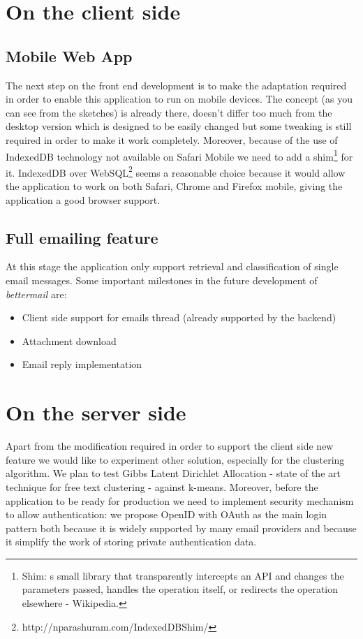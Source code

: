 \documentclass[a4paper,12pt]{report}
\begin{document}
\section{On the client side}
\subsection{Mobile Web App} %
\label{sub:mobile_web_app}


The next step on the front end development is to make the adaptation required in order to enable this application to run on mobile devices. The concept (as you can see from the sketches) is already there, doesn't differ too much from the desktop version which is designed to be easily changed but some tweaking is still required in order to make it work completely.
Moreover, because of the use of IndexedDB technology not available on Safari Mobile we need to add a shim\footnote{Shim: s small library that transparently intercepts an API and changes the parameters passed, handles the operation itself, or redirects the operation elsewhere - Wikipedia.} for it. IndexedDB over WebSQL\footnote{http://nparashuram.com/IndexedDBShim/} seems a reasonable choice because it would allow the application to work on both Safari, Chrome and Firefox mobile, giving the application a good browser support.
\subsection{Full emailing feature} %
\label{sub:full_emailing_feature}
At this stage the application only support retrieval and classification of single email messages. Some important milestones in the future development of \emph{bettermail} are:
\begin{itemize}
  \item Client side support for emails thread (already supported by the backend)
  \item Attachment download
  \item Email reply implementation 
\end{itemize}

\section{On the server side}

Apart from the modification required in order to support the client side new feature we would like to experiment other solution, especially for the clustering algorithm. We plan to test Gibbs Latent Dirichlet Allocation - state of the art technique for free text clustering - against k-means. 
Moreover, before the application to be ready for production we need to implement security mechanism to allow authentication: we propose OpenID with OAuth as the main login pattern both because it is widely supported by many email providers and because it simplify the work of storing private authentication data.
\end{document}
